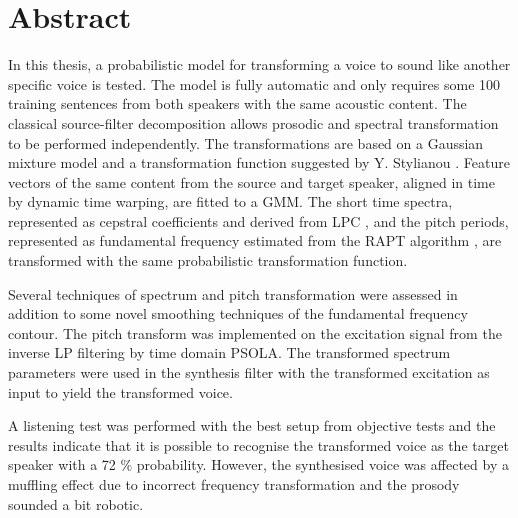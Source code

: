 % 
\chapter*{Abstract} %
\label{cha:abstract}
	In this thesis, a probabilistic model for transforming a voice to sound like another specific voice is tested. The model is fully automatic and only requires some 100 training sentences from both speakers with the same acoustic content. The classical source-filter decomposition allows prosodic and spectral transformation to be performed independently. The transformations are based on a Gaussian mixture model and a transformation function suggested by Y. Stylianou \cite{stylianou98}. Feature vectors of the same content from the source and target speaker, aligned in time by dynamic time warping, are fitted to a GMM. The short time spectra, represented as cepstral coefficients and derived from LPC \cite{atal68}, and the pitch periods, represented as fundamental frequency estimated from the RAPT algorithm \cite{talkin95}, are transformed with the same probabilistic transformation function.

Several techniques of spectrum and pitch transformation were assessed in addition to some novel smoothing techniques of the fundamental frequency contour. The pitch transform was implemented on the excitation signal from the inverse LP filtering by time domain PSOLA. The transformed spectrum parameters were used in the synthesis filter with the transformed excitation as input to yield the transformed voice.

	A listening test was performed with the best setup from objective tests and the results indicate that it is possible to recognise the transformed voice as the target speaker with a 72 \% probability. However, the synthesised voice was affected by a muffling effect due to incorrect frequency transformation and the prosody sounded a bit robotic.


